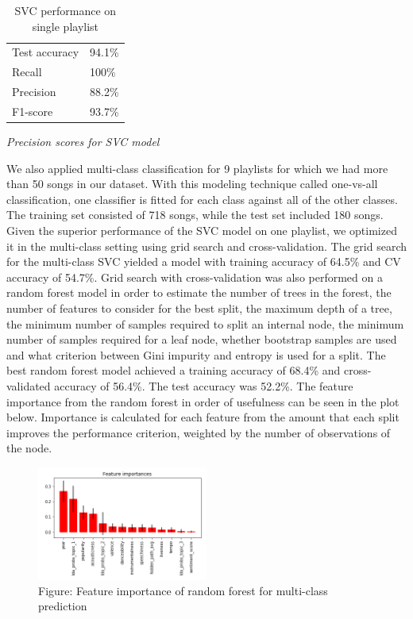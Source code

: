 \documentclass[acmtog]{acmart}
\begin{document}
\newpage
\begin{table}%
\caption{SVC performance on single playlist}
\label{tab:one}
\begin{minipage}{\columnwidth}
\begin{center}
\begin{tabular}{ll}
  \toprule
  Test accuracy    & 94.1\%\\
  Recall  & 100\%\\
  Precision    & 88.2\%\\
  F1-score    & 93.7\%\\
  \bottomrule
\end{tabular}
\end{center}
\bigskip\centering
\footnotesize
 \emph{Precision scores for SVC model}
\end{minipage}
\end{table}%
\newpage
We also applied multi-class classification for 9 playlists for which we had more than 50 songs in our dataset. With this modeling technique called one-vs-all classification, one classifier is fitted for each class against all of the other classes. The training set consisted of 718 songs, while the test set included 180 songs. Given the superior performance of the SVC model on one playlist, we optimized it in the multi-class setting using grid search and cross-validation. The grid search for the multi-class SVC yielded a model with training accuracy of 64.5\% and CV accuracy of 54.7\%. Grid search with cross-validation was also performed on a random forest model in order to estimate the number of trees in the forest, the number of features to consider for the best split, the maximum depth of a tree, the minimum number of samples required to split an internal node, the minimum number of samples required for a leaf node, whether bootstrap samples are used and what criterion between Gini impurity and entropy is used for a split. The best random forest model achieved a training accuracy of 68.4\% and cross-validated accuracy of 56.4\%. The test accuracy was 52.2\%. The feature importance from the random forest in order of usefulness can be seen in the plot below. Importance is calculated for each feature from the amount that each split improves the performance criterion, weighted by the number of observations of the node.

\begin{figure}[h]
  \includegraphics[width=0.5\textwidth]{feature_importance2.png}
  \caption{Figure: Feature importance of random forest for multi-class prediction}
  \label{fig:ROC_curve}
\end{figure}
\end{document}
